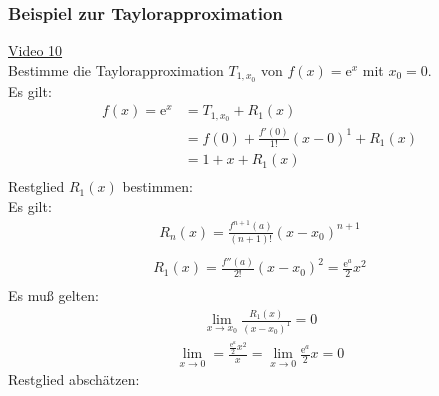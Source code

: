 \subsubsection{Beispiel zur Taylorapproximation}
\href{https://youtu.be/T6jBJ9BVPg8}{Video 10}\\
Bestimme die Taylorapproximation $ T_{1,x_0} $ von  $ f(x)=\mathrm{e}^x $ mit $ x_0=0 $.\\
Es gilt:\\
\begin{align*}
f(x)=\mathrm{e}^x&=T_{1,x_0}+R_1(x)\\
&=f(0)+\frac{f'(0)}{1!}(x-0)^1+R_1(x)\\
&=1+x+R_1(x)\\
\end{align*}
Restglied $ R_{1}(x) $ bestimmen:\\
Es gilt:\\
\begin{align*}
R_n(x)=\frac{f^{n+1}(a)}{(n+1)!}(x-x_0)^{n+1}\\
\end{align*}
\begin{align*}
R_1(x)=\frac{f''(a)}{2!}(x-x_0)^2=\frac{\mathrm{e}^a}{2}x^2\\
\end{align*}
\textbullet\;\;Es muß gelten:\\
\begin{align*}
\lim\limits_ {x\to x_0}\frac{R_1(x)}{(x-x_0)^1}=0
\end{align*}
\begin{align*}
\lim\limits_ {x\to 0}=\frac{\frac{\mathrm{e}^a}{2}x^2}{x}=\lim\limits_ {x\to 0}\frac{\mathrm{e}^a}{2}x=0
\end{align*}
\textbullet\;\;Restglied abschätzen:\\
